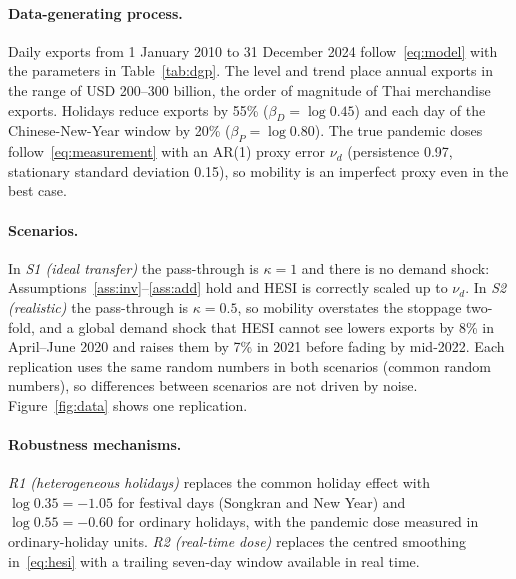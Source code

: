 \documentclass{article}
\theoremstyle{plain}
\theoremstyle{definition}
\theoremstyle{remark}
\begin{document}
\paragraph{Data-generating process.} Daily exports from 1 January 2010 to 31 December 2024 follow~\eqref{eq:model} with the parameters in Table~\ref{tab:dgp}. The level and trend place annual exports in the range of USD 200--300 billion, the order of magnitude of Thai merchandise exports. Holidays reduce exports by 55\% ($\beta_D=\log0.45$) and each day of the Chinese-New-Year window by 20\% ($\beta_P=\log0.80$). The true pandemic doses follow~\eqref{eq:measurement} with an AR(1) proxy error $\nu_d$ (persistence 0.97, stationary standard deviation 0.15), so mobility is an imperfect proxy even in the best case.

\paragraph{Scenarios.} In \emph{S1 (ideal transfer)} the pass-through is $\kappa=1$ and there is no demand shock: Assumptions~\ref{ass:inv}--\ref{ass:add} hold and HESI is correctly scaled up to $\nu_d$. In \emph{S2 (realistic)} the pass-through is $\kappa=0.5$, so mobility overstates the stoppage two-fold, and a global demand shock that HESI cannot see lowers exports by 8\% in April--June 2020 and raises them by 7\% in 2021 before fading by mid-2022. Each replication uses the same random numbers in both scenarios (common random numbers), so differences between scenarios are not driven by noise. Figure~\ref{fig:data} shows one replication.

\paragraph{Robustness mechanisms.} \emph{R1 (heterogeneous holidays)} replaces the common holiday effect with $\log0.35=-1.05$ for festival days (Songkran and New Year) and $\log0.55=-0.60$ for ordinary holidays, with the pandemic dose measured in ordinary-holiday units. \emph{R2 (real-time dose)} replaces the centred smoothing in~\eqref{eq:hesi} with a trailing seven-day window available in real time.
\end{document}
